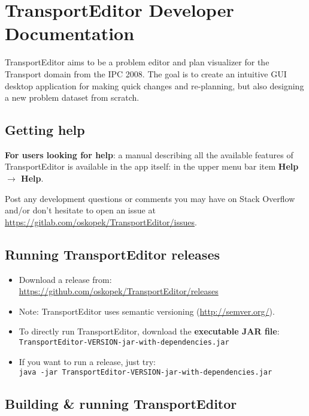 \newpage

\section*{TransportEditor Developer Documentation}\label{transporteditor-developer-documentation}

TransportEditor aims to be a problem editor and plan visualizer for the Transport domain from the IPC 2008.
The goal is to create an intuitive GUI desktop application for making quick changes and re-planning,
but also designing a new problem dataset from scratch.

\subsection*{Getting help}

\textbf{For users looking for help}: a manual describing all the available features of TransportEditor is available in the app itself:
in the upper menu bar item \textbf{Help $\to$ Help}.

Post any development questions or comments you may have on Stack Overflow and/or don't hesitate to
open an issue at \url{https://gitlab.com/oskopek/TransportEditor/issues}.

\subsection*{Running TransportEditor releases}
\begin{itemize}
\item Download a release from:\\ \url{https://github.com/oskopek/TransportEditor/releases}

\item Note: TransportEditor uses semantic versioning (\url{http://semver.org/}).

\item To directly run TransportEditor, download the \textbf{executable JAR file}: \texttt{TransportEditor-VERSION-jar-with-dependencies.jar}

\item If you want to run a release, just try:\\ \texttt{java -jar TransportEditor-VERSION-jar-with-dependencies.jar}
\end{itemize}

\subsection*{Building \& running TransportEditor}\label{readme-building}

